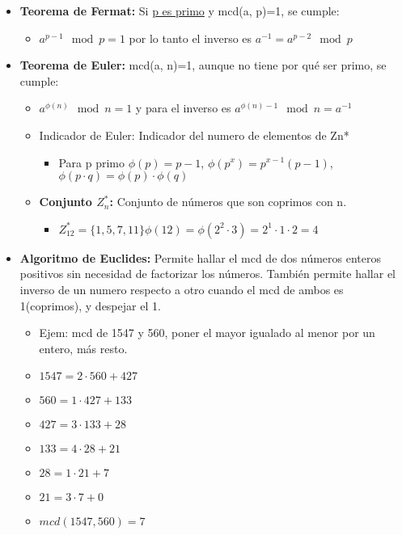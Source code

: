 \documentclass[12pt, twoside, openright]{report} %
\begin{document}
\begin{itemize}
	\item \textbf{Teorema de Fermat:} Si \underline{p es primo} y mcd(a, p)=1, se cumple:
	      \begin{itemize}
		      \item $a^{p-1} \mod p = 1$ por lo tanto el inverso es $a^{-1} = a^{p-2} \mod p$
	      \end{itemize}
	\item \textbf{Teorema de Euler:} mcd(a, n)=1, aunque no tiene por qué ser primo, se cumple:
	      \begin{itemize}
		      \item $a^{\phi(n)} \mod n = 1$ y para el inverso es $a^{\phi(n)-1} \mod n = a^{-1}$
		      \item Indicador de Euler: Indicador del numero de elementos de Zn*
		            \begin{itemize}
			            \item Para p primo $\phi(p)=p-1$, $\phi(p^x)=p^{x-1}(p-1)$, $\phi(p\cdot q) = \phi(p)\cdot\phi(q)$
		            \end{itemize}
		      \item \textbf{Conjunto $Z_n^*$:} Conjunto de números que son coprimos con n.
		            \begin{itemize}
			            \item $Z_{1 2}^* = \{ 1, 5, 7, 11\} \phi(12) = \phi(2^2\cdot 3)=2^1 \cdot 1 \cdot 2 = 4$
		            \end{itemize}
	      \end{itemize}
	\item \textbf{Algoritmo de Euclides:} Permite hallar el mcd de dos números enteros positivos sin necesidad de factorizar los números. También permite hallar el inverso de un numero respecto a otro cuando el mcd de ambos es 1(coprimos), y despejar el 1.
	      \begin{itemize}
		      \item Ejem: mcd de 1547 y 560, poner el mayor igualado al menor por un entero, más resto.
		      \item $1547 = 2 · 560 + 427$
		      \item $560 = 1 · 427 + 133$
		      \item $427 = 3 · 133 + 28$
		      \item $133 = 4 · 28 + 21$
		      \item $28 = 1 · 21 + 7$
		      \item $21 = 3 · 7 + 0$
		      \item $mcd(1547,560) = 7$

\end{itemize}
\end{itemize}
\end{document}
